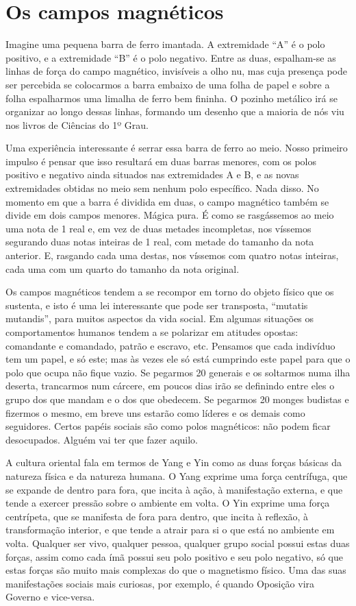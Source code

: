 \chapter{Os campos magnéticos}

Imagine uma pequena barra de ferro imantada. A extremidade “A” é o
polo positivo, e a extremidade “B” é o polo negativo. Entre as duas,
espalham-se as linhas de força do campo magnético, invisíveis a olho
nu, mas cuja presença pode ser percebida se colocarmos a barra
embaixo de uma folha de papel e sobre a folha espalharmos uma limalha
de ferro bem fininha. O pozinho metálico irá se organizar ao longo
dessas linhas, formando um desenho que a maioria de nós viu nos
livros de Ciências do 1º Grau. 

Uma experiência interessante é serrar essa barra de ferro ao meio.
Nosso primeiro impulso é pensar que isso resultará em duas barras
menores, com os polos positivo e negativo ainda situados nas
extremidades A e B, e as novas extremidades obtidas no meio sem
nenhum polo específico. Nada disso. No momento em que a barra é
dividida em duas, o campo magnético também se divide em dois campos
menores. Mágica pura. É como se rasgássemos ao meio uma nota de 1
real e, em vez de duas metades incompletas, nos víssemos segurando
duas notas inteiras de 1 real, com metade do tamanho da nota
anterior. E, rasgando cada uma destas, nos víssemos com quatro notas
inteiras, cada uma com um quarto do tamanho da nota original.

Os campos magnéticos tendem a se recompor em torno do objeto físico
que os sustenta, e isto é uma lei interessante que pode ser
transposta, “mutatis mutandis”, para muitos aspectos da vida social.
Em algumas situações os comportamentos humanos tendem a se polarizar
em atitudes opostas: comandante e comandado, patrão e escravo, etc.
Pensamos que cada indivíduo tem um papel, e só este; mas às vezes ele
só está cumprindo este papel para que o polo que ocupa não fique
vazio. Se pegarmos 20 generais e os soltarmos numa ilha deserta,
trancarmos num cárcere, em poucos dias irão se definindo entre eles o
grupo dos que mandam e o dos que obedecem. Se pegarmos 20 monges
budistas e fizermos o mesmo, em breve uns estarão como líderes e os
demais como seguidores. Certos papéis sociais são como polos
magnéticos: não podem ficar desocupados. Alguém vai ter que fazer
aquilo.

A cultura oriental fala em termos de Yang e Yin como as duas forças
básicas da natureza física e da natureza humana. O Yang exprime uma
força centrífuga, que se expande de dentro para fora, que incita à
ação, à manifestação externa, e que tende a exercer pressão sobre o
ambiente em volta. O Yin exprime uma força centrípeta, que se
manifesta de fora para dentro, que incita à reflexão, à transformação
interior, e que tende a atrair para si o que está no ambiente em
volta.  Qualquer ser vivo, qualquer pessoa, qualquer grupo social
possui estas duas forças, assim como cada ímã possui seu polo
positivo e seu polo negativo, só que estas forças são muito mais
complexas do que o magnetismo físico. Uma das suas manifestações
sociais mais curiosas, por exemplo, é quando Oposição vira Governo e
vice-versa.


